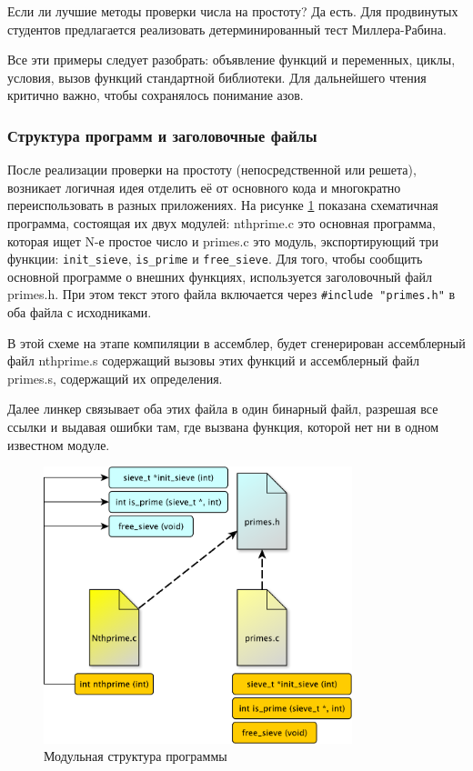 \documentclass[a4paper,12pt,oneside]{article}
\begin{document}
Если ли лучшие методы проверки числа на простоту? Да есть. Для продвинутых студентов предлагается реализовать детерминированный тест Миллера-Рабина. 

Все эти примеры следует разобрать: объявление функций и переменных, циклы, условия, вызов функций стандартной библиотеки. Для дальнейшего чтения критично важно, чтобы сохранялось понимание азов.

\subsubsection{Структура программ и заголовочные файлы}\label{ProgramStructure}

После реализации проверки на простоту (непосредственной или решета), возникает логичная идея отделить её от основного кода и многократно переиспользовать в разных приложениях. На рисунке \ref{fig:module_struct} показана схематичная программа, состоящая их двух модулей: nthprime.c это основная программа, которая ищет N-е простое число и primes.c это модуль, экспортирующий три функции: \lstinline!init_sieve!, \lstinline!is_prime! и \lstinline!free_sieve!. Для того, чтобы сообщить основной программе о внешних функциях, используется заголовочный файл primes.h. При этом текст этого файла включается через \lstinline!#include "primes.h"! в оба файла с исходниками.

В этой схеме на этапе компиляции в ассемблер, будет сгенерирован ассемблерный файл nthprime.s содержащий вызовы этих функций и ассемблерный файл primes.s, содержащий их определения.

Далее линкер связывает оба этих файла в один бинарный файл, разрешая все ссылки и выдавая ошибки там, где вызвана функция, которой нет ни в одном известном модуле.

\begin{figure}[h!]
\centering
\includegraphics[width=0.8\textwidth]{illustrations/module-structure-crop.pdf}
\caption{Модульная структура программы}
\label{fig:module_struct}
\end{figure}
\end{document}
